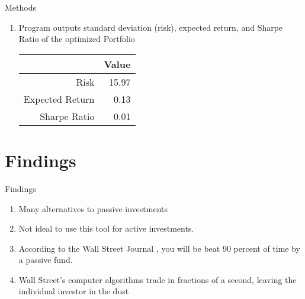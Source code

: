 \documentclass[handout,t]{beamer}
\begin{document}
\begin{frame}[allowframebreaks]{Methods}
\begin{doublespacing}
\begin{enumerate}
            	    \framebreak
            	    \item Program outputs standard deviation (risk), expected return, and Sharpe Ratio of the optimized Portfolio
                        \begin{table}[ht]
                        \centering
                        \begin{tabular}{rr}
                          \hline
                         & Value \\ 
                          \hline
                        Risk & 15.97 \\ 
                          Expected Return & 0.13 \\ 
                          Sharpe Ratio & 0.01 \\ 
                           \hline
                        \end{tabular}
                        \end{table}
            	    
            	\end{enumerate}
            \end{doublespacing}
        \end{frame}
        
    \section{Findings}
        \begin{frame}{Findings}
        	\begin{doublespacing}
            	\begin{enumerate}
            	    \item Many alternatives to passive investments
            	    \item Not ideal to use this tool for active investments. 
            	    \item According to the Wall Street Journal \citet{Malkie2017} , you will be beat 90 percent of time by a passive fund.
            	    \item Wall Street's computer algorithms trade in fractions of a second, leaving the individual investor in the dust \citet{Patter2020}
            	\end{enumerate}
            \end{doublespacing}
        \end{frame}
        
\end{document}
